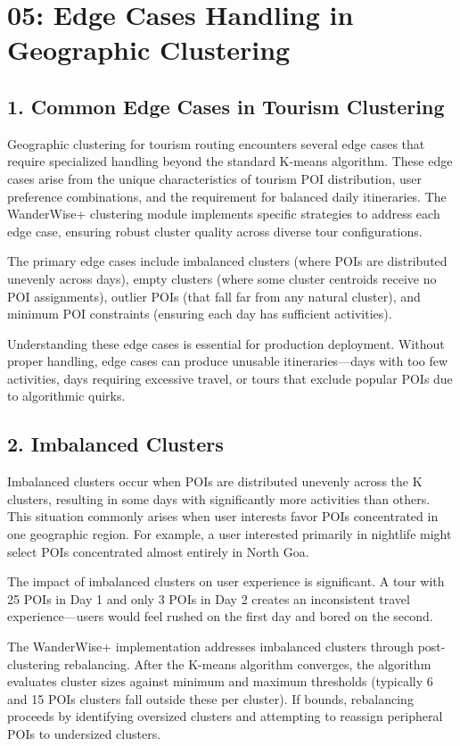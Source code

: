 \chapter{05: Edge Cases Handling in Geographic Clustering}

\section{1. Common Edge Cases in Tourism Clustering}

Geographic clustering for tourism routing encounters several edge cases that require specialized handling beyond the standard K-means algorithm. These edge cases arise from the unique characteristics of tourism POI distribution, user preference combinations, and the requirement for balanced daily itineraries. The WanderWise+ clustering module implements specific strategies to address each edge case, ensuring robust cluster quality across diverse tour configurations.

The primary edge cases include imbalanced clusters (where POIs are distributed unevenly across days), empty clusters (where some cluster centroids receive no POI assignments), outlier POIs (that fall far from any natural cluster), and minimum POI constraints (ensuring each day has sufficient activities).

Understanding these edge cases is essential for production deployment. Without proper handling, edge cases can produce unusable itineraries—days with too few activities, days requiring excessive travel, or tours that exclude popular POIs due to algorithmic quirks.

\section{2. Imbalanced Clusters}

Imbalanced clusters occur when POIs are distributed unevenly across the K clusters, resulting in some days with significantly more activities than others. This situation commonly arises when user interests favor POIs concentrated in one geographic region. For example, a user interested primarily in nightlife might select POIs concentrated almost entirely in North Goa.

The impact of imbalanced clusters on user experience is significant. A tour with 25 POIs in Day 1 and only 3 POIs in Day 2 creates an inconsistent travel experience—users would feel rushed on the first day and bored on the second.

The WanderWise+ implementation addresses imbalanced clusters through post-clustering rebalancing. After the K-means algorithm converges, the algorithm evaluates cluster sizes against minimum and maximum thresholds (typically 6 and 15 POIs clusters fall outside these per cluster). If bounds, rebalancing proceeds by identifying oversized clusters and attempting to reassign peripheral POIs to undersized clusters.

